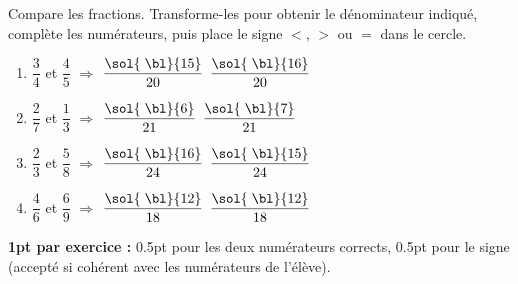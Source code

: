 
\question[4]
Compare les fractions. Transforme-les pour obtenir le dénominateur indiqué, complète les numérateurs, puis place le signe $<$, $>$ ou $=$ dans le cercle.

\vspace{10pt}
\begin{enumerate}[leftmargin=*,align=parleft, label=\alph*), itemsep=25pt]
\item $\dfrac{3}{4}$ et $\dfrac{4}{5}$ \quad \quad $\Longrightarrow$ \quad\quad $\dfrac{\sol{\;\bl}{15}}{20}$ \quad {} \quad $\dfrac{\sol{\;\bl}{16}}{20}$
\item $\dfrac{2}{7}$ et $\dfrac{1}{3}$ \quad \quad $\Longrightarrow$ \quad\quad $\dfrac{\sol{\;\bl}{6}}{21}$ \quad {} \quad $\dfrac{\sol{\;\bl}{7}}{21}$
\item $\dfrac{2}{3}$ et $\dfrac{5}{8}$ \quad \quad $\Longrightarrow$ \quad \quad$\dfrac{\sol{\;\bl}{16}}{24}$ \quad {} \quad $\dfrac{\sol{\;\bl}{15}}{24}$
\item $\dfrac{4}{6}$ et $\dfrac{6}{9}$ \quad \quad $\Longrightarrow$ \quad\quad $\dfrac{\sol{\;\bl}{12}}{18}$ \quad {} \quad $\dfrac{\sol{\;\bl}{12}}{18}$
\end{enumerate}

\begin{solution}[0pt]
\textbf{1pt par exercice :} 0.5pt pour les deux numérateurs corrects, 0.5pt pour le signe (accepté si cohérent avec les numérateurs de l'élève).
\end{solution}